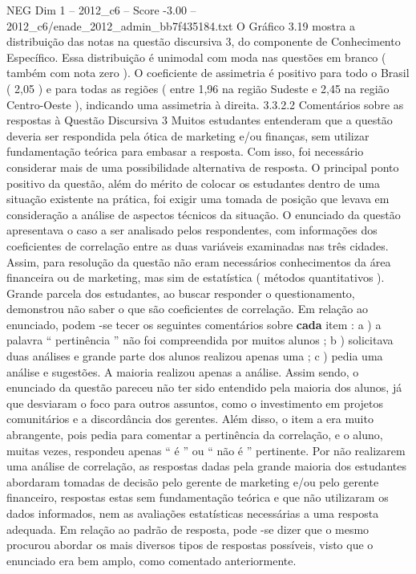 \begin{textsample}{NEG Dim 1 – 2012\_c6 – Score -3.00 – 2012\_c6/enade\_2012\_admin\_bb7f435184.txt}
O Gráfico 3.19 mostra a distribuição das notas na questão discursiva 3, do componente de Conhecimento Específico.
Essa distribuição é unimodal com moda nas questões em branco ( também com nota zero ).
O coeficiente de assimetria é positivo para todo o Brasil ( 2,05 ) e para todas as regiões ( entre 1,96 na região Sudeste e 2,45 na região Centro-Oeste ), indicando uma assimetria à direita. 3.3.2.2 Comentários sobre as respostas à Questão Discursiva 3 Muitos estudantes entenderam que a questão deveria ser respondida pela ótica de marketing e/ou finanças, sem utilizar fundamentação teórica para embasar a resposta.
Com isso, foi necessário considerar mais de uma possibilidade alternativa de resposta.
O principal ponto positivo da questão, além do mérito de colocar os estudantes dentro de uma situação existente na prática, foi exigir uma tomada de posição que levava em consideração a análise de aspectos técnicos da situação.
O enunciado da questão apresentava o caso a ser analisado pelos respondentes, com informações dos coeficientes de correlação entre as duas variáveis examinadas nas três cidades.
Assim, para resolução da questão não eram necessários conhecimentos da área financeira ou de marketing, mas sim de estatística ( métodos quantitativos ).
Grande parcela dos estudantes, ao buscar responder o questionamento, demonstrou não saber o que são coeficientes de correlação.
Em relação ao enunciado, podem -se tecer os seguintes comentários sobre \textbf{cada} item : a ) a palavra “ pertinência ” não foi compreendida por muitos alunos ; b ) solicitava duas análises e grande parte dos alunos realizou apenas uma ; c ) pedia uma análise e sugestões.
A maioria realizou apenas a análise.
Assim sendo, o enunciado da questão pareceu não ter sido entendido pela maioria dos alunos, já que desviaram o foco para outros assuntos, como o investimento em projetos comunitários e a discordância dos gerentes.
Além disso, o item a era muito abrangente, pois pedia para comentar a pertinência da correlação, e o aluno, muitas vezes, respondeu apenas “ é ” ou “ não é ” pertinente.
Por não realizarem uma análise de correlação, as respostas dadas pela grande maioria dos estudantes abordaram tomadas de decisão pelo gerente de marketing e/ou pelo gerente financeiro, respostas estas sem fundamentação teórica e que não utilizaram os dados informados, nem as avaliações estatísticas necessárias a uma resposta adequada.
Em relação ao padrão de resposta, pode -se dizer que o mesmo procurou abordar os mais diversos tipos de respostas possíveis, visto que o enunciado era bem amplo, como comentado anteriormente.

\end{textsample}
